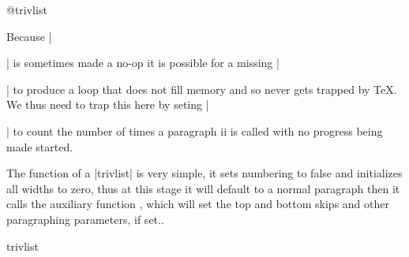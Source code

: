  \begin{docCommand}{@trivlist}{}
 \end{docCommand}
  Because |\par| is sometimes made a no-op it is possible for a missing
 |\item| to produce a loop that does not fill memory and so never gets
 trapped by \TeX.  We thus need to trap this here by seting |\par| to
 count the number of times a paragraph ii is called with no progress
 being made started.
    \begin{teX}
\def\@trivlist{%
  \if@noskipsec \leavevmode \fi
  \@topsepadd \topsep
  \ifvmode
    \advance\@topsepadd \partopsep
  \else
    \unskip \par
  \fi
  \if@inlabel
    \@noparitemtrue
    \@noparlisttrue
  \else
    \if@newlist \@noitemerr \fi
    \@noparlistfalse
    \@topsep \@topsepadd
  \fi
  \advance\@topsep \parskip
  \leftskip \z@skip
  \rightskip \@rightskip
  \parfillskip \@flushglue
  \par@deathcycles \z@
  \@setpar{\if@newlist
             \advance\par@deathcycles \@ne
             \ifnum \par@deathcycles >\@m
               \@noitemerr
               {\@@par}%
             \fi
           \else
             {\@@par}%
           \fi}%
  \global \@newlisttrue
  \@outerparskip \parskip}
    \end{teX}

The function of a |trivlist| is very simple, it sets numbering to false and initializes all  widths to zero, thus at this stage it will default to a normal paragraph then it calls the auxiliary function , which will set
the top and bottom skips and other paragraphing parameters, if set..

 \begin{docCommand}{trivlist} {  }
 \end{docCommand} 
     \begin{teX}
\def\trivlist{%
  \parsep\parskip
  \@nmbrlistfalse
  \@trivlist
  \labelwidth\z@
  \leftmargin\z@
  \itemindent\z@
    \end{teX}

    We initialise |\@itemlabel| so that a \texttt{trivlist} with
    an |\item| not having an optional argument doesn't produce an
    error message.

 \begin{docCommand} {makelabel} {\marg{item label}}
 \end{docCommand}
    \begin{teX}
  \let\@itemlabel\@empty
  \def\makelabel##1{##1}}
    \end{teX}


